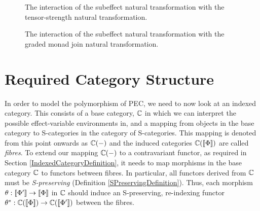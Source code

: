 \documentclass{Report}
\begin{document}
\begin{figure}[H]
\centering
\begin{minipage}{0.45\textwidth}
    \qquad
    \caption{The interaction of the subeffect natural transformation with the tensor-strength natural transformation.}
    \label{SubeffectTensorStrength}
\end{minipage}  
\quad
\begin{minipage}{0.45\textwidth}
\caption{The interaction of the subeffect natural transformation with the graded monad join natural transformation.}
\label{SubeffectBind}
\end{minipage}  
\end{figure}


\section{Required Category Structure}\label{PECRequirements}

In order to model the polymorphism of PEC, we need to now look at an indexed category. This consists of a base category, $\mathbb{C}$ in which we can interpret the possible effect-variable environments in, and a mapping from objects in the base category to S-categories in the category of S-categories. This mapping is denoted from this point onwards as $\mathbb{C}(-)$ and the induced categories $\mathbb{C}({\bf [\![}\Phi{\bf ]\!]})$ are called \textit{fibres}. To extend our mapping $\mathbb{C}(-)$ to a contravariant functor, as required in Section \ref{IndexedCategoryDefinition}, it needs to map morphisms in the base category $\mathbb{C}$ to functors between fibres. In particular, all functors derived from $\mathbb{C}$ must be \textit{S-preserving} (Definition \ref{SPreservingDefinition}). Thus, each morphism $\theta: {\bf [\![}\Phi'{\bf ]\!]}\rightarrow{\bf [\![}\Phi{\bf ]\!]}$ in $\mathbb{C}$ should induce an S-preserving, re-indexing functor $\theta^*: \mathbb{C}({\bf [\![}\Phi{\bf ]\!]})\rightarrow\mathbb{C}({\bf [\![}\Phi'{\bf ]\!]})$ between the fibres.
\end{document}

